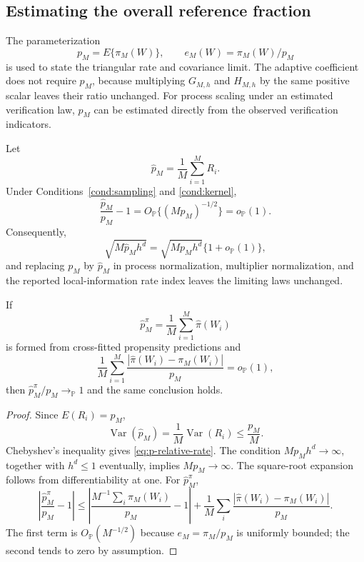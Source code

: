 \subsection{Estimating the overall reference fraction}
\label{sec:supp-p-estimation}

The parameterization
\[
p_M=E\{\pi_M(W)\},
\qquad
e_M(W)=\pi_M(W)/p_M
\]
is used to state the triangular rate and covariance limit. The adaptive coefficient does not require \(p_M\), because multiplying \(G_{M,h}\) and \(H_{M,h}\) by the same positive scalar leaves their ratio unchanged. For process scaling under an estimated verification law, \(p_M\) can be estimated directly from the observed verification indicators.

\begin{proposition}
\label{prop:p-estimation}
Let
\[
\widehat p_M
=
\frac1M\sum_{i=1}^MR_i.
\]
Under Conditions~\ref{cond:sampling} and \ref{cond:kernel},
\begin{equation}
\frac{\widehat p_M}{p_M}-1
=
O_{\mathbb P}\{(Mp_M)^{-1/2}\}
=o_{\mathbb P}(1).
\label{eq:p-relative-rate}
\end{equation}
Consequently,
\[
\sqrt{M\widehat p_Mh^d}
=
\sqrt{Mp_Mh^d}\{1+o_{\mathbb P}(1)\},
\]
and replacing \(p_M\) by \(\widehat p_M\) in process normalization, multiplier normalization, and the reported local-information rate index leaves the limiting laws unchanged.

If
\[
\widehat p_M^{\pi}
=
\frac1M\sum_{i=1}^M\widehat\pi(W_i)
\]
is formed from cross-fitted propensity predictions and
\[
\frac1M\sum_{i=1}^M
\frac{|\widehat\pi(W_i)-\pi_M(W_i)|}{p_M}
=o_{\mathbb P}(1),
\]
then \(\widehat p_M^{\pi}/p_M\to_{\mathbb P}1\) and the same conclusion holds.
\end{proposition}

\begin{proof}
Since \(E(R_i)=p_M\),
\[
\operatorname{Var}(\widehat p_M)
=
\frac1M\operatorname{Var}(R_i)
\le
\frac{p_M}{M}.
\]
Chebyshev's inequality gives \eqref{eq:p-relative-rate}. The condition \(Mp_Mh^d\to\infty\), together with \(h^d\le1\) eventually, implies \(Mp_M\to\infty\). The square-root expansion follows from differentiability at one. For \(\widehat p_M^{\pi}\),
\[
\left|
\frac{\widehat p_M^{\pi}}{p_M}-1
\right|
\le
\left|
\frac{M^{-1}\sum_i\pi_M(W_i)}{p_M}-1
\right|
+
\frac1M\sum_i
\frac{|\widehat\pi(W_i)-\pi_M(W_i)|}{p_M}.
\]
The first term is \(O_{\mathbb P}(M^{-1/2})\) because \(e_M=\pi_M/p_M\) is uniformly bounded; the second tends to zero by assumption.
\end{proof}
